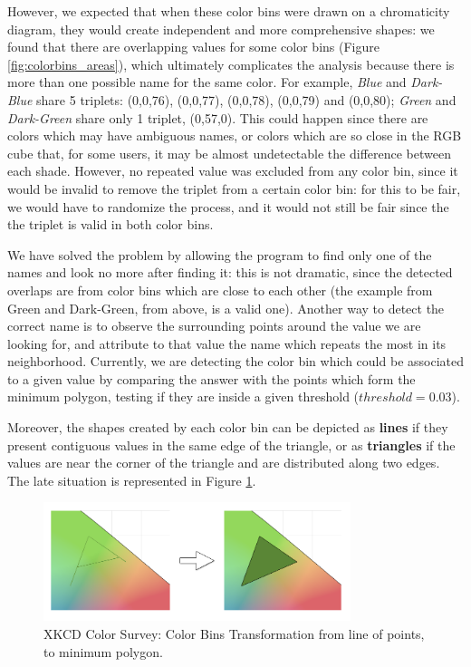 %
However, we expected that when these color bins were drawn on a chromaticity diagram, they would create independent and more comprehensive shapes: we found that there are overlapping
values for some color bins (Figure \ref{fig:colorbins_areas}), which ultimately complicates the analysis because there is more than one possible name for the same color. For example, \emph{Blue} and \emph{Dark-Blue}
share 5 triplets: (0,0,76), (0,0,77), (0,0,78), (0,0,79) and (0,0,80); \emph{Green} and \emph{Dark-Green} share only 1 triplet, (0,57,0). This could happen since there are colors which may have ambiguous names, or
colors which are so close in the RGB cube that, for some users, it may be almost undetectable the difference between each shade. However, no repeated value was excluded from any color bin, since it would be invalid to
remove the triplet from a certain color bin: for this to be fair, we would have to randomize the process, and it would not still be fair since the the triplet is valid in both color bins. \par
%
We have solved the problem by allowing the program to find only one of the names and look no more after finding it: this is not dramatic, since the detected overlaps are from color bins which are close to each other
(the example from Green and Dark-Green, from above, is a valid one). Another way to detect the correct name is to observe the surrounding points around the value we are looking for, and attribute to that value the name
which repeats the most in its neighborhood. Currently, we are detecting the color bin which could be associated to a given value by comparing the answer with the points which form the
minimum polygon, testing if they are inside a given threshold ($threshold = 0.03$). \par
%
Moreover, the shapes created by each color bin can be depicted as \textbf{lines} if they present contiguous values in the same edge of the triangle, or as \textbf{triangles}
if the values are near the corner of the triangle and are distributed along two edges. The late situation is represented in Figure \ref{fig:colorbins_triangle}.
%
\begin{figure}
  \centering
  \includegraphics[width=0.8\textwidth]{images/results/colorbins_transformation.png}
  \caption[XKCD Color Survey: Color Bins Transformation]{XKCD Color Survey: Color Bins Transformation from line of points, to minimum polygon.}
  \label{fig:colorbins_triangle}
\end{figure} \par

